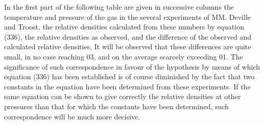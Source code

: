\documentclass[12pt]{article}
\begin{document}
In the first part of the following table are given in successive columns the temperature and pressure of the gas in the several experiments of MM. Deville and Troost, the relative densities calculated from these numbers by equation (336), the relative densities as observed, and the difference of the observed and calculated relative densities. It will be observed that these differences are quite small, in no case reaching 03, and on the average scarcely exceeding 01. The significance of such correspondence in favour of the hypothesis by means of which equation (336) has been established is of course diminished by the fact that two constants in the equation have been determined from these experiments. If the same equation can be shown to give correctly the relative densities at other pressures than that for which the constants have been determined, such correspondence will be much more decisive.
\end{document}
